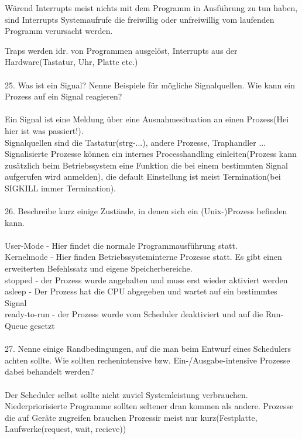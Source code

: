 \documentclass{article}
\begin{document}
W\"arend Interrupts meist nichts mit dem Programm in Ausf\"uhrung zu tun haben, sind Interrupts Systemaufrufe die freiwillig oder unfreiwillig vom laufenden Programm verursacht werden.

Traps werden idr. von Programmen ausgel\"ost, Interrupts aus der Hardware(Tastatur, Uhr, Platte etc.)
\\
\\
25. Was ist ein Signal? Nenne Beispiele für mögliche Signalquellen. Wie kann ein Prozess auf
ein Signal reagieren?
\\
\\
Ein Signal ist eine Meldung \"uber eine Ausnahmesituation an einen Prozess(Hei hier ist was passiert!).\\
Signalquellen sind die Tastatur(strg-...), andere Prozesse, Traphandler ...\\
Signalisierte Prozesse k\"onnen ein internes Processhandling einleiten(Prozess kann zus\"atzlich beim Betriebssystem eine Funktion die bei einem bestimmten Signal aufgerufen wird anmelden), die default Einstellung ist meist Termination(bei SIGKILL immer Termination).
\\
\\
26. Beschreibe kurz einige Zustände, in denen sich ein (Unix-)Prozess befinden kann.
\\
\\
User-Mode - Hier findet die normale Programmausf\"uhrung statt.\\
Kernelmode - Hier finden Betriebssysteminterne Prozesse statt. Es gibt einen erweiterten Befehlssatz und eigene Speicherbereiche.\\
stopped - der Prozess wurde angehalten und muss erst wieder aktiviert werden\\
asleep - Der Prozess hat die CPU abgegeben und wartet auf ein bestimmtes Signal\\
ready-to-run - der Prozess wurde vom Scheduler deaktiviert und auf die Run- Queue gesetzt
\\
\\
27. Nenne einige Randbedingungen, auf die man beim Entwurf eines Schedulers achten sollte.
Wie sollten rechenintensive bzw. Ein-/Ausgabe-intensive Prozesse dabei behandelt werden?
\\
\\
Der Scheduler selbst sollte nicht zuviel Systemleistung verbrauchen.
Niederpriorisierte Programme sollten seltener dran kommen als andere.
Prozesse die auf Ger\"ate zugreifen brauchen Prozessir meist nur kurz(Festplatte, Laufwerke(request, wait, recieve))
\end{document}
